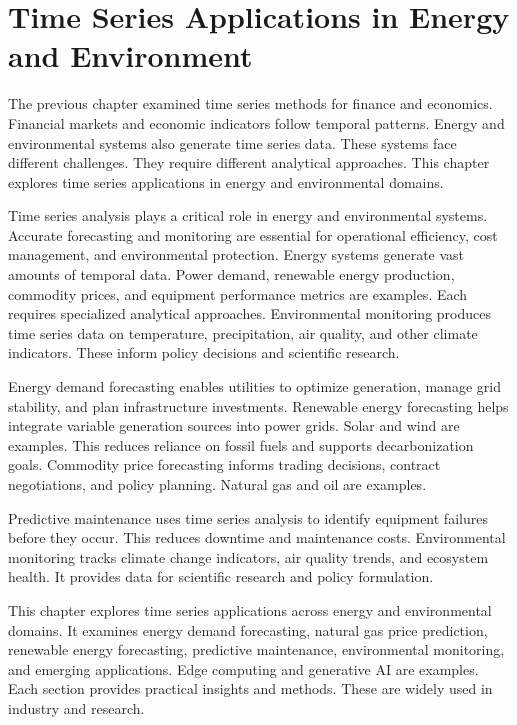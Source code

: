 \chapter{Time Series Applications in Energy and Environment}

The previous chapter examined time series methods for finance and economics. Financial markets and economic indicators follow temporal patterns. Energy and environmental systems also generate time series data. These systems face different challenges. They require different analytical approaches. This chapter explores time series applications in energy and environmental domains.

Time series analysis plays a critical role in energy and environmental systems. Accurate forecasting and monitoring are essential for operational efficiency, cost management, and environmental protection. Energy systems generate vast amounts of temporal data. Power demand, renewable energy production, commodity prices, and equipment performance metrics are examples. Each requires specialized analytical approaches. Environmental monitoring produces time series data on temperature, precipitation, air quality, and other climate indicators. These inform policy decisions and scientific research.

Energy demand forecasting enables utilities to optimize generation, manage grid stability, and plan infrastructure investments. Renewable energy forecasting helps integrate variable generation sources into power grids. Solar and wind are examples. This reduces reliance on fossil fuels and supports decarbonization goals. Commodity price forecasting informs trading decisions, contract negotiations, and policy planning. Natural gas and oil are examples.

Predictive maintenance uses time series analysis to identify equipment failures before they occur. This reduces downtime and maintenance costs. Environmental monitoring tracks climate change indicators, air quality trends, and ecosystem health. It provides data for scientific research and policy formulation.

This chapter explores time series applications across energy and environmental domains. It examines energy demand forecasting, natural gas price prediction, renewable energy forecasting, predictive maintenance, environmental monitoring, and emerging applications. Edge computing and generative AI are examples. Each section provides practical insights and methods. These are widely used in industry and research.

